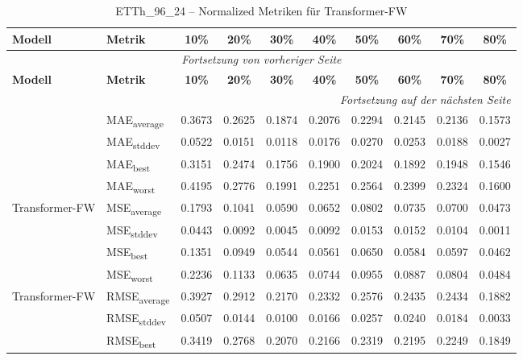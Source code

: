 {\small
\begin{longtable}{l l c c c c c c c c}
    \toprule
    \textbf{Modell} & \textbf{Metrik} & \textbf{10\%} & \textbf{20\%} & \textbf{30\%} & \textbf{40\%} & \textbf{50\%} & \textbf{60\%} & \textbf{70\%} & \textbf{80\%} \\
    \midrule
    \endfirsthead
    \multicolumn{10}{c}{\textit{Fortsetzung von vorheriger Seite}} \\
    \toprule
    \textbf{Modell} & \textbf{Metrik} & \textbf{10\%} & \textbf{20\%} & \textbf{30\%} & \textbf{40\%} & \textbf{50\%} & \textbf{60\%} & \textbf{70\%} & \textbf{80\%} \\
    \midrule
    \endhead
    \midrule
    \multicolumn{10}{r}{\textit{Fortsetzung auf der nächsten Seite}} \\
    \midrule
    \endfoot
    \bottomrule
    \caption{ETTh_96_24 -- Normalized Metriken für Transformer-FW}
    \label{tab:etth_96_24_normalized_transformer-fw}
    \endlastfoot
\multirow{4}{*}{Transformer-FW} & MAE\textsubscript{average} & 0.3673 & 0.2625 & 0.1874 & 0.2076 & 0.2294 & 0.2145 & 0.2136 & 0.1573 \\
 & MAE\textsubscript{stddev} & 0.0522 & 0.0151 & 0.0118 & 0.0176 & 0.0270 & 0.0253 & 0.0188 & 0.0027 \\
 & MAE\textsubscript{best} & 0.3151 & 0.2474 & 0.1756 & 0.1900 & 0.2024 & 0.1892 & 0.1948 & 0.1546 \\
 & MAE\textsubscript{worst} & 0.4195 & 0.2776 & 0.1991 & 0.2251 & 0.2564 & 0.2399 & 0.2324 & 0.1600 \\
\cmidrule(lr){2-10}
\multirow{4}{*}{Transformer-FW} & MSE\textsubscript{average} & 0.1793 & 0.1041 & 0.0590 & 0.0652 & 0.0802 & 0.0735 & 0.0700 & 0.0473 \\
 & MSE\textsubscript{stddev} & 0.0443 & 0.0092 & 0.0045 & 0.0092 & 0.0153 & 0.0152 & 0.0104 & 0.0011 \\
 & MSE\textsubscript{best} & 0.1351 & 0.0949 & 0.0544 & 0.0561 & 0.0650 & 0.0584 & 0.0597 & 0.0462 \\
 & MSE\textsubscript{worst} & 0.2236 & 0.1133 & 0.0635 & 0.0744 & 0.0955 & 0.0887 & 0.0804 & 0.0484 \\
\cmidrule(lr){2-10}
\multirow{4}{*}{Transformer-FW} & RMSE\textsubscript{average} & 0.3927 & 0.2912 & 0.2170 & 0.2332 & 0.2576 & 0.2435 & 0.2434 & 0.1882 \\
 & RMSE\textsubscript{stddev} & 0.0507 & 0.0144 & 0.0100 & 0.0166 & 0.0257 & 0.0240 & 0.0184 & 0.0033 \\
 & RMSE\textsubscript{best} & 0.3419 & 0.2768 & 0.2070 & 0.2166 & 0.2319 & 0.2195 & 0.2249 & 0.1849 \\

\end{longtable}}

